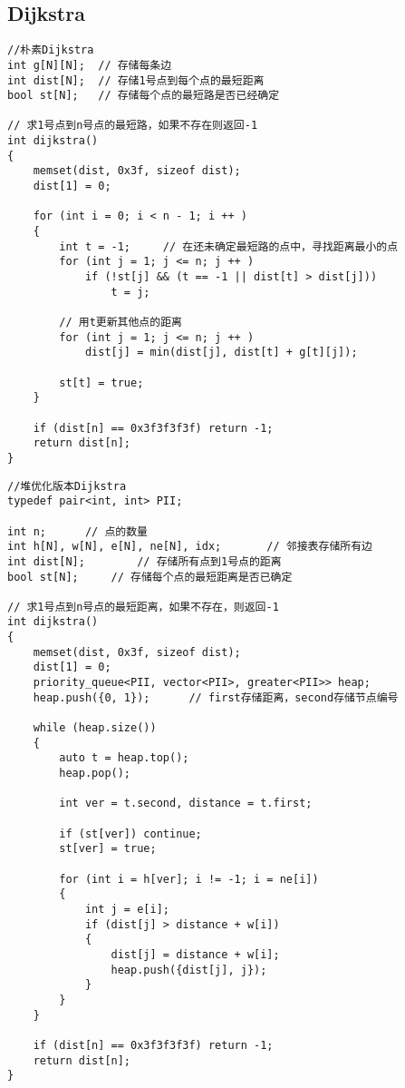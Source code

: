 \documentclass[12pt,a4paper,UTF16]{ctexbook}
\theoremstyle{plain}
\begin{document}
\subsection{Dijkstra}
\begin{lstlisting}
//朴素Dijkstra
int g[N][N];  // 存储每条边
int dist[N];  // 存储1号点到每个点的最短距离
bool st[N];   // 存储每个点的最短路是否已经确定

// 求1号点到n号点的最短路，如果不存在则返回-1
int dijkstra()
{
    memset(dist, 0x3f, sizeof dist);
    dist[1] = 0;

    for (int i = 0; i < n - 1; i ++ )
    {
        int t = -1;     // 在还未确定最短路的点中，寻找距离最小的点
        for (int j = 1; j <= n; j ++ )
            if (!st[j] && (t == -1 || dist[t] > dist[j]))
                t = j;

        // 用t更新其他点的距离
        for (int j = 1; j <= n; j ++ )
            dist[j] = min(dist[j], dist[t] + g[t][j]);

        st[t] = true;
    }

    if (dist[n] == 0x3f3f3f3f) return -1;
    return dist[n];
}
\end{lstlisting}
\begin{lstlisting}
//堆优化版本Dijkstra
typedef pair<int, int> PII;

int n;      // 点的数量
int h[N], w[N], e[N], ne[N], idx;       // 邻接表存储所有边
int dist[N];        // 存储所有点到1号点的距离
bool st[N];     // 存储每个点的最短距离是否已确定

// 求1号点到n号点的最短距离，如果不存在，则返回-1
int dijkstra()
{
    memset(dist, 0x3f, sizeof dist);
    dist[1] = 0;
    priority_queue<PII, vector<PII>, greater<PII>> heap;
    heap.push({0, 1});      // first存储距离，second存储节点编号

    while (heap.size())
    {
        auto t = heap.top();
        heap.pop();

        int ver = t.second, distance = t.first;

        if (st[ver]) continue;
        st[ver] = true;

        for (int i = h[ver]; i != -1; i = ne[i])
        {
            int j = e[i];
            if (dist[j] > distance + w[i])
            {
                dist[j] = distance + w[i];
                heap.push({dist[j], j});
            }
        }
    }

    if (dist[n] == 0x3f3f3f3f) return -1;
    return dist[n];
}
\end{lstlisting}
\end{document}
